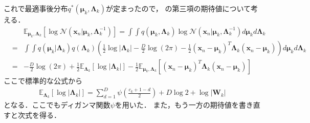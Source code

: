 これで最適事後分布$q^*(\bm\mu_{k},\bm\Lambda_{k})$が定まったので，
の第三項の期待値について考える．
\begin{eqnarray}
&& 
\mathbb{E}_{\bm\mu_k,\bm\Lambda_k}
    \left[\log \mathcal{N}\left(\bm{x}_n\big|\bm\mu_{k},\bm\Lambda_{k}^{-1}\right)\right]
= \int\!\!\!\int 
q(\bm\mu_{k},\bm\Lambda_{k})
\log \mathcal{N}\left(\bm{x}_n\big|\bm\mu_{k},\bm\Lambda_{k}^{-1}\right) 
d\bm\mu_{k} d\bm\Lambda_{k}
\nonumber\\
&=& 
\int\!\!\!\int 
q(\bm\mu_{k}|\bm\Lambda_{k})q(\bm\Lambda_{k})
\left(
\frac{1}{2} \log |\bm\Lambda_{k}| - \frac{D}{2} \log (2\pi)
- \frac{1}{2} 
\left(\bm{x}_n - \bm\mu_{k}\right)^T
\bm\Lambda_{k}
\left(\bm{x}_n - \bm\mu_{k}\right)
\right)
d\bm\mu_{k} d\bm\Lambda_{k}
\nonumber\\
&=&
- \frac{D}{2} \log (2\pi)
+ \frac{1}{2} \mathbb{E}_{\bm\Lambda_{k}} 
  \left[\log |\bm\Lambda_{k}|\right]
- \frac{1}{2} \mathbb{E}_{\bm\mu_{k},\bm\Lambda_{k}}
  \left[
  \left(\bm{x}_n - \bm\mu_{k}\right)^T
  \bm\Lambda_{k}
  \left(\bm{x}_n - \bm\mu_{k}\right)\right]
\label{eq:egauss}
\end{eqnarray}
ここで標準的な公式から
\begin{eqnarray}
\mathbb{E}_{\bm\Lambda_{k}} \left[\log |\bm\Lambda_{k}|\right]
= \sum_{d=1}^{D}\psi\left(\frac{c_{k} + 1 - d}{2}\right)
+ D \log 2 + \log |\bm{W}_{k}|
\label{eq:elambdakm}
\end{eqnarray}
となる．ここでもディガンマ関数$\psi$を用いた．
また，もう一方の期待値を書き直すと次式を得る．
